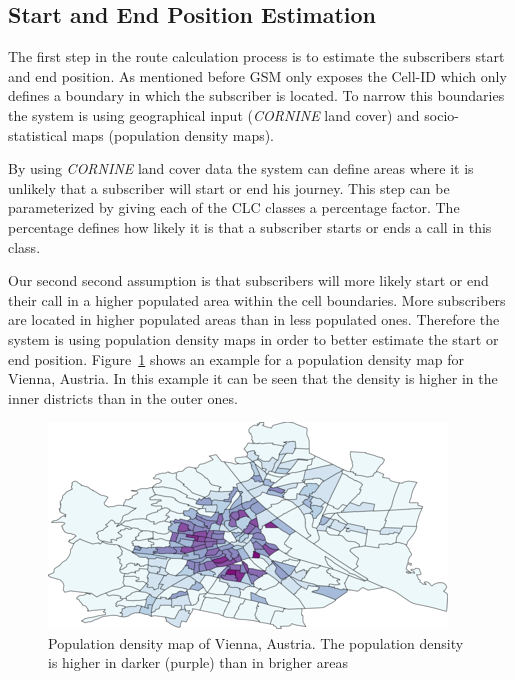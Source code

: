 \documentclass[master,english]{hgbthesis}
\begin{document}
\subsection{Start and End Position Estimation}

The first step in the route calculation process is to estimate the subscribers start and end position. As mentioned before GSM only exposes the Cell-ID which only defines a boundary in which the subscriber is located. To narrow this boundaries the system is using geographical input (\emph{CORNINE} land cover) and socio-statistical maps (population density maps). 

By using \emph{CORNINE} land cover data the system can define areas where it is unlikely that a subscriber will start or end his journey. This step can be parameterized by giving each of the CLC classes a percentage factor. The percentage defines how likely it is that a subscriber starts or ends a call in this class.

Our second second assumption is that subscribers will more likely start or end their call in a higher populated area within the cell boundaries. More subscribers are located in higher populated areas than in less populated ones. Therefore the system is using population density maps in order to better estimate the start or end position. Figure~\ref{fig:pop_vienna} shows an example for a population density map for Vienna, Austria. In this example it can be seen that the density is higher in the inner districts than in the outer ones.

\begin{figure}

	\centering

	\includegraphics[width=0.7\linewidth]{./images/pop_vienna.png}

	\caption{Population density map of Vienna, Austria. The population density is higher in darker (purple) than in brigher areas}

	\label{fig:pop_vienna}

\end{figure}
\end{document}
